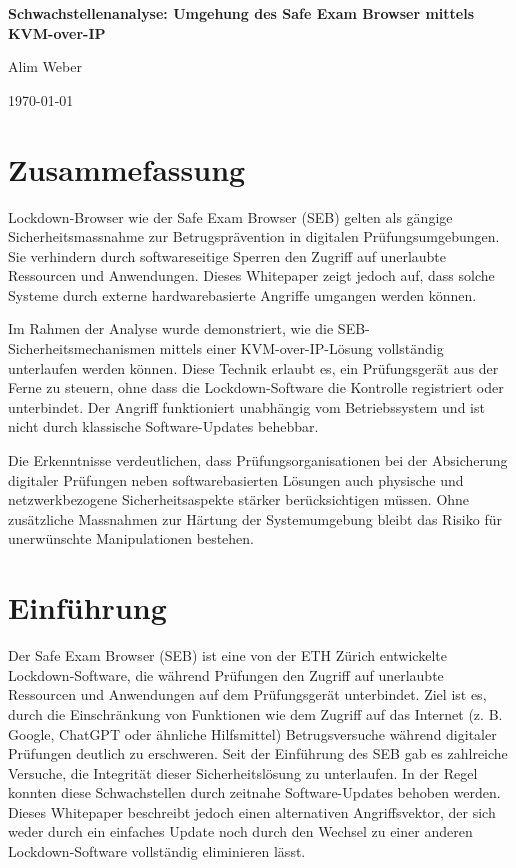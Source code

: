 \documentclass[14pt]{article}
\begin{document}
\begin{titlepage}
    \centering
    \vspace*{5cm}
    {\huge\bfseries Schwachstellenanalyse: Umgehung des Safe Exam Browser mittels KVM-over-IP\par}
    \vspace{1.5cm}
    {\large Alim Weber\par}

    {\large \today\par}
\end{titlepage}

\newpage
\section*{Zusammefassung}
Lockdown-Browser wie der Safe Exam Browser (SEB) gelten als gängige Sicherheitsmassnahme zur Betrugsprävention in digitalen Prüfungsumgebungen. Sie verhindern durch softwareseitige Sperren den Zugriff auf unerlaubte Ressourcen und Anwendungen. Dieses Whitepaper zeigt jedoch auf, dass solche Systeme durch externe hardwarebasierte Angriffe umgangen werden können.

Im Rahmen der Analyse wurde demonstriert, wie die SEB-Sicherheitsmechanismen mittels einer KVM-over-IP-Lösung vollständig unterlaufen werden können. Diese Technik erlaubt es, ein Prüfungsgerät aus der Ferne zu steuern, ohne dass die Lockdown-Software die Kontrolle registriert oder unterbindet. Der Angriff funktioniert unabhängig vom Betriebssystem und ist nicht durch klassische Software-Updates behebbar.

Die Erkenntnisse verdeutlichen, dass Prüfungsorganisationen bei der Absicherung digitaler Prüfungen neben softwarebasierten Lösungen auch physische und netzwerkbezogene Sicherheitsaspekte stärker berücksichtigen müssen. Ohne zusätzliche Massnahmen zur Härtung der Systemumgebung bleibt das Risiko für unerwünschte Manipulationen bestehen.

\newpage
\tableofcontents

\newpage
\section{Einführung}
Der Safe Exam Browser (SEB) ist eine von der ETH Zürich entwickelte Lockdown-Software, die während Prüfungen den Zugriff auf unerlaubte Ressourcen und Anwendungen auf dem Prüfungsgerät unterbindet. Ziel ist es, durch die Einschränkung von Funktionen wie dem Zugriff auf das Internet (z. B. Google, ChatGPT oder ähnliche Hilfsmittel) Betrugsversuche während digitaler Prüfungen deutlich zu erschweren. Seit der Einführung des SEB gab es zahlreiche Versuche, die Integrität dieser Sicherheitslösung zu unterlaufen. In der Regel konnten diese Schwachstellen durch zeitnahe Software-Updates behoben werden. Dieses Whitepaper beschreibt jedoch einen alternativen Angriffsvektor, der sich weder durch ein einfaches Update noch durch den Wechsel zu einer anderen Lockdown-Software vollständig eliminieren lässt.
\end{document}
